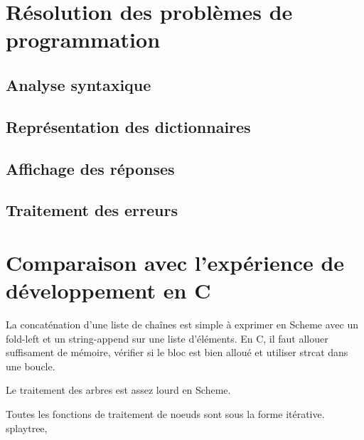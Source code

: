 \documentclass{article}
\begin{document}
  \section{Résolution des problèmes de programmation}

  \subsection{Analyse syntaxique}

  \subsection{Représentation des dictionnaires}

  \subsection{Affichage des réponses}

  \subsection{Traitement des erreurs}

  \section{Comparaison avec l'expérience de développement en C}

  La concaténation d'une liste de chaînes est simple à exprimer en Scheme avec
  un \textsf{fold-left} et un \textsf{string-append} sur une liste d'éléments.
  En C, il faut allouer suffisament de mémoire, vérifier si le bloc est bien
  alloué et utiliser \textsf{strcat} dans une boucle.

  Le traitement des arbres est assez lourd en Scheme.

  Toutes les fonctions de traitement de noeuds sont sous la forme itérative.
  \textsf{splaytree}, \textsf{}

  \section{}
\end{document}
